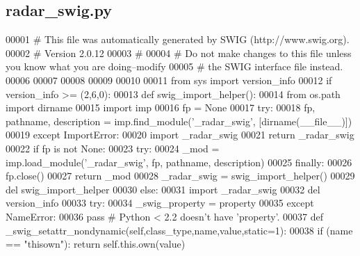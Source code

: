 \subsection{radar\+\_\+swig.\+py}
\label{radar__swig_8py_source}

\begin{DoxyCode}
00001 \textcolor{comment}{# This file was automatically generated by SWIG (http://www.swig.org).}
00002 \textcolor{comment}{# Version 2.0.12}
00003 \textcolor{comment}{#}
00004 \textcolor{comment}{# Do not make changes to this file unless you know what you are doing--modify}
00005 \textcolor{comment}{# the SWIG interface file instead.}
00006 
00007 
00008 
00009 
00010 
00011 \textcolor{keyword}{from} sys \textcolor{keyword}{import} version\_info
00012 \textcolor{keywordflow}{if} version\_info >= (2,6,0):
00013     \textcolor{keyword}{def }swig_import_helper():
00014         \textcolor{keyword}{from} os.path \textcolor{keyword}{import} dirname
00015         \textcolor{keyword}{import} imp
00016         fp = \textcolor{keywordtype}{None}
00017         \textcolor{keywordflow}{try}:
00018             fp, pathname, description = imp.find\_module(\textcolor{stringliteral}{'\_radar\_swig'}, [dirname(\_\_file\_\_)])
00019         \textcolor{keywordflow}{except} ImportError:
00020             \textcolor{keyword}{import} \_radar\_swig
00021             \textcolor{keywordflow}{return} \_radar\_swig
00022         \textcolor{keywordflow}{if} fp \textcolor{keywordflow}{is} \textcolor{keywordflow}{not} \textcolor{keywordtype}{None}:
00023             \textcolor{keywordflow}{try}:
00024                 \_mod = imp.load\_module(\textcolor{stringliteral}{'\_radar\_swig'}, fp, pathname, description)
00025             \textcolor{keywordflow}{finally}:
00026                 fp.close()
00027             \textcolor{keywordflow}{return} \_mod
00028     \_radar\_swig = swig_import_helper()
00029     del swig\_import\_helper
00030 \textcolor{keywordflow}{else}:
00031     \textcolor{keyword}{import} \_radar\_swig
00032 del version\_info
00033 \textcolor{keywordflow}{try}:
00034     \_swig\_property = property
00035 \textcolor{keywordflow}{except} NameError:
00036     \textcolor{keywordflow}{pass} \textcolor{comment}{# Python < 2.2 doesn't have 'property'.}
00037 \textcolor{keyword}{def }_swig_setattr_nondynamic(self,class\_type,name,value,static=1):
00038     \textcolor{keywordflow}{if} (name == \textcolor{stringliteral}{"thisown"}): \textcolor{keywordflow}{return} self.this.own(value)

\end{DoxyCode}
